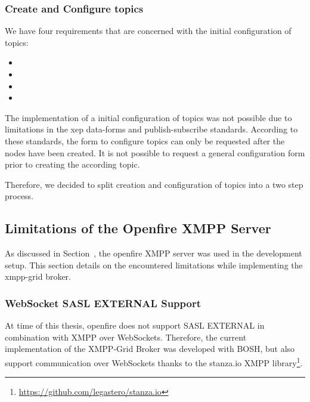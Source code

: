 \subsubsection{Create and Configure \glspl{topic}}

We have four requirements that are concerned with the initial configuration of \glspl{topic}:
\begin{itemize}
  \item {}
  \item {}
  \item {}
  \item {}
\end{itemize}

The implementation of a initial configuration of \glspl{topic} was not possible due to limitations in the \gls{xep} \gls{data-forms} and \gls{publish-subscribe} standards. According to these standards, the form to configure \glspl{topic} can only be requested after the nodes have been created. It is not possible to request a general configuration form prior to creating the according \gls{topic}.~\cite{xep-0004, xep-0060}

Therefore, we decided to split creation and configuration of \glspl{topic} into a two step process.

\subsection{Limitations of the Openfire XMPP Server}\label{sec:limitations-of-the-openfire-xmpp-server}

As discussed in Section~, the openfire XMPP server was used in the development setup. This section details on the encountered limitations while implementing the \gls{xmpp-grid} \gls{broker}.

\subsubsection{WebSocket SASL EXTERNAL Support}

At time of this thesis, openfire does not support SASL EXTERNAL in combination with XMPP over WebSockets.
Therefore, the current implementation of the XMPP-Grid Broker was developed with BOSH, but also support communication over WebSockets thanks to the stanza.io XMPP library\footnote{\url{https://github.com/legastero/stanza.io}}.

